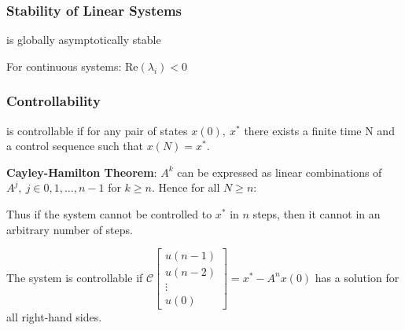 \documentclass[8pt,a4paper]{scrartcl}
\begin{document}
\begin{multicols*}{3}
\subsubsection{Stability of Linear Systems}


is globally asymptotically stable


For continuous systems: Re$(\lambda_i)<0$

\subsubsection{Controllability}


is controllable if for any pair of states $x(0),\ x^\ast$ there exists a finite time N and a control sequence such that $x(N)=x^\ast$.


\textbf{Cayley-Hamilton Theorem}: $A^k$ can be expressed as linear combinations of $A^j,\ j\in0,1,\ldots,n-1$ for $k\geq n$. Hence for all $N\geq n$:


Thus if the system cannot be controlled to $x^\ast$ in $n$ steps, then it cannot in an arbitrary number of steps.


The system is controllable if $\mathcal{C}\begin{bmatrix}u(n-1)\\u(n-2)\\ \vdots\\u(0)\end{bmatrix}=x^\ast-A^nx(0)$ has a solution for all right-hand sides.


\end{multicols*}
\end{document}
